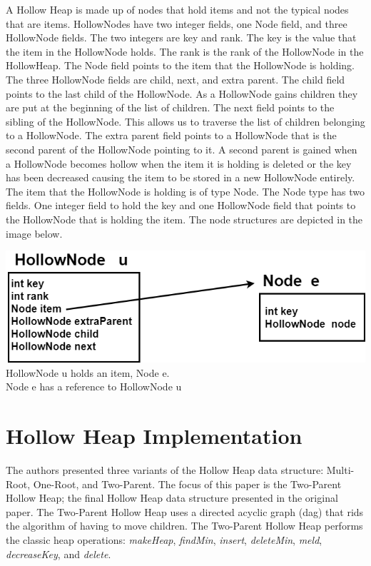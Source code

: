 \documentclass[letter,10pt]{article}
\begin{document}
A Hollow Heap is made up of nodes that hold items and not the typical nodes that are items. HollowNodes have two integer fields, one Node field, and three HollowNode fields. The two integers are key and rank. The key is the value that the item in the HollowNode holds. The rank is the rank of the HollowNode in the HollowHeap. The Node field points to the item that the HollowNode is holding. The three HollowNode fields are child, next, and extra parent. The child field points to the last child of the HollowNode. As a HollowNode gains children they are put at the beginning of the list of children. The next field points to the sibling of the HollowNode. This allows us to traverse the list of children belonging to a HollowNode. The extra parent field points to a HollowNode that is the second parent of the HollowNode pointing to it. A second parent is gained when a HollowNode becomes hollow when the item it is holding is deleted or the key has been decreased causing the item to be stored in a new HollowNode entirely. The item that the HollowNode is holding is of type Node. The Node type has two fields. One integer field to hold the key and one HollowNode field that points to the HollowNode that is holding the item. The node structures are depicted in the image below.\\
\begin{center}
	\includegraphics[scale=.5]{one.png}\\
	\phantom{helloworld}
	HollowNode u holds an item, Node e.\\
	Node e has a reference to HollowNode u\\
\end{center}

\medskip

\section{Hollow Heap Implementation} 
\quad The authors presented three variants of the Hollow Heap data structure: Multi-Root, One-Root, and Two-Parent. The focus of this paper is the Two-Parent Hollow Heap; the final Hollow Heap data structure presented in the original paper. The Two-Parent Hollow Heap uses a directed acyclic graph (dag) that rids the algorithm of having to move children. The Two-Parent Hollow Heap performs the classic heap operations: \textit{makeHeap}, \textit{findMin}, \textit{insert}, \textit{deleteMin}, \textit{meld}, \textit{decreaseKey}, and \textit{delete}.\\ 
\end{document}
